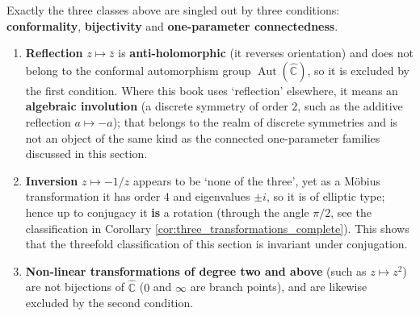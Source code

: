 \begin{remark}\label{rem:why_not_reflection}
Exactly the three classes above are singled out by three conditions: \textbf{conformality}, \textbf{bijectivity} and \textbf{one-parameter connectedness}.
\begin{enumerate}[label=(\roman*)]
    \item \textbf{Reflection} $z\mapsto\bar z$ is \textbf{anti-holomorphic} (it reverses orientation) and does not belong to the conformal automorphism group $\operatorname{Aut}(\hat{\mathbb C})$, so it is excluded by the first condition. Where this book uses `reflection' elsewhere, it means an \textbf{algebraic involution} (a discrete symmetry of order $2$, such as the additive reflection $a\mapsto-a$); that belongs to the realm of discrete symmetries and is not an object of the same kind as the connected one-parameter families discussed in this section.
    \item \textbf{Inversion} $z\mapsto-1/z$ appears to be `none of the three', yet as a Möbius transformation it has order $4$ and eigenvalues $\pm i$, so it is of elliptic type; hence up to conjugacy it \textbf{is} a rotation (through the angle $\pi/2$, see the classification in Corollary \ref{cor:three_transformations_complete}). This shows that the threefold classification of this section is invariant under conjugation.
    \item \textbf{Non-linear transformations of degree two and above} (such as $z\mapsto z^2$) are not bijections of $\hat{\mathbb C}$ ($0$ and $\infty$ are branch points), and are likewise excluded by the second condition.
\end{enumerate}
\end{remark}

